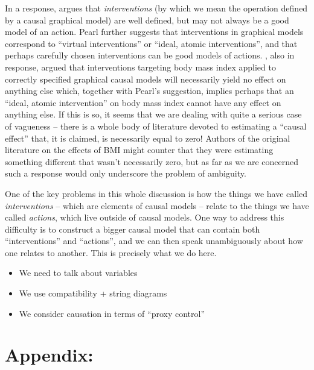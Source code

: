 \documentclass{article}
\theoremstyle{plain}
\theoremstyle{definition}
\begin{document}
In a response, \citet{pearl_does_2018} argues that \emph{interventions} (by which we mean the operation defined by a causal graphical model) are well defined, but may not always be a good model of an action. Pearl further suggests that interventions in graphical models correspond to ``virtual interventions'' or ``ideal, atomic interventions'', and that perhaps carefully chosen interventions can be good models of actions. \citet{shahar_association_2009}, also in response, argued that interventions targeting body mass index applied to correctly specified graphical causal models will necessarily yield no effect on anything else which, together with Pearl's suggestion, implies perhaps that an ``ideal, atomic intervention'' on body mass index cannot have any effect on anything else. If this is so, it seems that we are dealing with quite a serious case of vagueness -- there is a whole body of literature devoted to estimating a ``causal effect'' that, it is claimed, is necessarily equal to zero! Authors of the original literature on the effects of BMI might counter that they were estimating something different that wasn't necessarily zero, but as far as we are concerned such a response would only underscore the problem of ambiguity.

One of the key problems in this whole discussion is how the things we have called \emph{interventions} -- which are elements of causal models -- relate to the things we have called \emph{actions}, which live outside of causal models. One way to address this difficulty is to construct a bigger causal model that can contain both ``interventions'' and ``actions'', and we can then speak unambiguously about how one relates to another. This is precisely what we do here.

\begin{itemize}
  \item We need to talk about variables
  \item We use compatibility + string diagrams
  \item We consider causation in terms of ``proxy control''
\end{itemize}









% 
% 
% 
% 
% 




\appendix
\newpage
\section*{Appendix:}

% 
\end{document}
